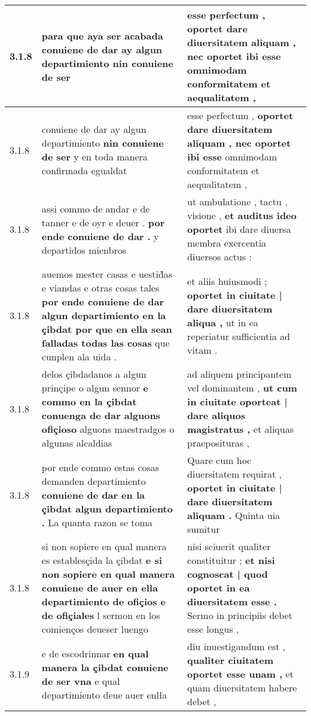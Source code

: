 \begin{tabular}{|p{1cm}|p{6.5cm}|p{6.5cm}|}
3.1.8 & para que aya ser acabada \textbf{ conuiene de dar ay algun departimiento } nin conuiene de ser & esse perfectum , \textbf{ oportet dare diuersitatem aliquam , nec oportet ibi esse } omnimodam conformitatem et aequalitatem , \\\hline
3.1.8 & conuiene de dar ay algun departimiento \textbf{ nin conuiene de ser } y en toda manera confirmada egualdat & esse perfectum , \textbf{ oportet dare diuersitatem aliquam , nec oportet ibi esse } omnimodam conformitatem et aequalitatem , \\\hline
3.1.8 & assi commo de andar e de tanner e de oyr e deuer . \textbf{ por ende conuiene de dar . } y departidos mienbros & ut ambulatione , tactu , visione , \textbf{ et auditus ideo oportet } ibi dare diuersa membra exercentia diuersos actus : \\\hline
3.1.8 & auemos mester casas e uestid̃as e viandas e otras cosas tales \textbf{ por ende conuiene de dar algun departimiento en la çibdat por que en ella sean falladas todas las cosas } que cunplen ala uida . & et aliis huiusmodi ; \textbf{ oportet in ciuitate | dare diuersitatem aliqua , } ut in ea reperiatur sufficientia ad vitam . \\\hline
3.1.8 & delos çibdadanos a algun prinçipe o algun sennor \textbf{ e commo en la çibdat conuenga de dar alguons ofiçioso } alguons maestradgos o algunas alcaldias & ad aliquem principantem vel dominantem , \textbf{ ut cum in ciuitate oporteat | dare aliquos magistratus , } et aliquas praeposituras , \\\hline
3.1.8 & por ende commo estas cosas demanden departimiento \textbf{ conuiene de dar en la çibdat algun departimiento . } La quanta razon se toma & Quare cum hoc diuersitatem requirat , \textbf{ oportet in ciuitate | dare diuersitatem aliquam . } Quinta uia sumitur \\\hline
3.1.8 & si non sopiere en qual manera es establesçida la çibdat \textbf{ e si non sopiere en qual manera conuiene de auer en ella departimiento de ofiçios e de ofiçiales } l sermon en los comienços deueser luengo & nisi sciuerit qualiter constituitur ; \textbf{ et nisi cognoscat | quod oportet in ea diuersitatem esse . } Sermo in principiis debet esse longus , \\\hline
3.1.9 & e de escodrinnar \textbf{ en qual manera la çibdat conuiene de ser vna } e qual departimiento deue auer enlła & diu inuestigandum est , \textbf{ qualiter ciuitatem oportet esse unam , } et quam diuersitatem habere debet , \\\hline

\end{tabular}

